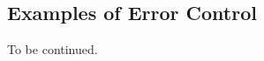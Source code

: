 \documentclass{report}
\theoremstyle{exampstyle} \newtheorem{example}[theorem]{Example}
\theoremstyle{exampstyle} \newtheorem{remark}[theorem]{Remark}
\theoremstyle{exampstyle} \newtheorem{definition}[theorem]{Definition}
\theoremstyle{exampstyle} \newtheorem{lemma}[theorem]{Lemma}
\begin{document}



\subsection{Examples of Error Control}

To be continued.







\appendix
\end{document}
